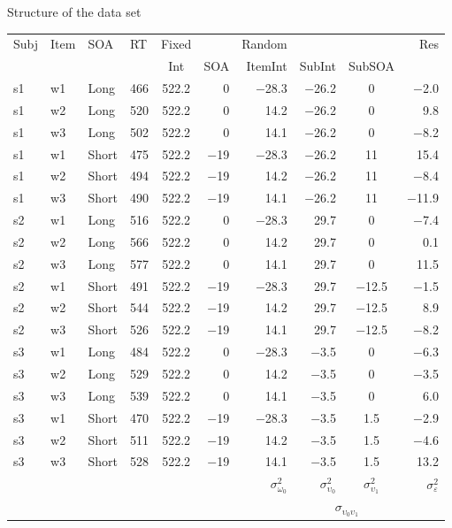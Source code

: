 \documentclass[aspectratio=169]{beamer}
\begin{document}
\begin{frame}{Structure of the data set}
  \vspace{.2cm}
  \scriptsize
  \centering
  \begin{tabular}{llllcrrrcr}
    \hline
    Subj & Item & SOA & RT & Fixed &&  Random &&& Res \\
    \cline{5-6}
    \cline{7-10}
    & & & & Int & SOA & ItemInt & SubInt & SubSOA & \\
    \hline
    s1 & w1 & Long  & 466 & 522.2 & 0     & $-$28.3 & $-$26.2 & 0       & $-$2.0 \\
    s1 & w2 & Long  & 520 & 522.2 & 0     & 14.2    & $-$26.2 & 0       & 9.8 \\
    s1 & w3 & Long  & 502 & 522.2 & 0     & 14.1    & $-$26.2 & 0       & $-$8.2 \\
    s1 & w1 & Short & 475 & 522.2 & $-$19 & $-$28.3 & $-$26.2 & 11      & 15.4 \\
    s1 & w2 & Short & 494 & 522.2 & $-$19 & 14.2    & $-$26.2 & 11      & $-$8.4 \\
    s1 & w3 & Short & 490 & 522.2 & $-$19 & 14.1    & $-$26.2 & 11      & $-$11.9 \\
    s2 & w1 & Long  & 516 & 522.2 & 0     & $-$28.3 & 29.7    & 0       & $-$7.4 \\
    s2 & w2 & Long  & 566 & 522.2 & 0     & 14.2    & 29.7    & 0       & 0.1 \\
    s2 & w3 & Long  & 577 & 522.2 & 0     & 14.1    & 29.7    & 0       & 11.5 \\
    s2 & w1 & Short & 491 & 522.2 & $-$19 & $-$28.3 & 29.7    & $-$12.5 & $-$1.5 \\
    s2 & w2 & Short & 544 & 522.2 & $-$19 & 14.2    & 29.7    & $-$12.5 & 8.9 \\
    s2 & w3 & Short & 526 & 522.2 & $-$19 & 14.1    & 29.7    & $-$12.5 & $-$8.2 \\
    s3 & w1 & Long  & 484 & 522.2 & 0     & $-$28.3 & $-$3.5  & 0       & $-$6.3 \\
    s3 & w2 & Long  & 529 & 522.2 & 0     & 14.2    & $-$3.5  & 0       & $-$3.5 \\
    s3 & w3 & Long  & 539 & 522.2 & 0     & 14.1    & $-$3.5  & 0       & 6.0 \\
    s3 & w1 & Short & 470 & 522.2 & $-$19 & $-$28.3 & $-$3.5  & 1.5     & $-$2.9 \\
    s3 & w2 & Short & 511 & 522.2 & $-$19 & 14.2    & $-$3.5  & 1.5     & $-$4.6 \\
    s3 & w3 & Short & 528 & 522.2 & $-$19 & 14.1    & $-$3.5  & 1.5     & 13.2 \\
    \hline
    &&&&&& $\sigma^2_{\omega_0}$ & $\sigma^2_{\upsilon_0}$ &
    $\sigma^2_{\upsilon_1}$ & $\sigma^2_{\varepsilon}$\\ 
    &&&&&&  & \multicolumn{2}{c}{$\sigma_{\upsilon_0\upsilon_1}$} & 
  \end{tabular}
\end{frame}
\end{document}
